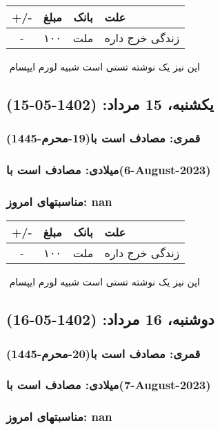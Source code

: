 \documentclass{article}
\newcommand{\rnote}[1]{\marginpar{\textcolor{color}{\StrSubstitute{\##1}{ }{\_}}}}
\newcommand{\myRow}[4]{
    #1 & #2 & #3 & #4 \\ \hline
}
\begin{document}
\begin{tabular}{ | c | c | c | p{5cm} |}
    \hline
    \myRow{ +/- }{مبلغ}{بانک}{علت}
    \myRow{-}{۱۰۰}{ملت}{زندگی خرج داره}
\end{tabular}
\newline
\newline

‌
\rnote{تست}
این نیز یک نوشته تستی است شبیه لورم ایپسام




\newpage
{}
\textcolor{color}{
\section{ یکشنبه، 15 مرداد: (1402-05-15) }
\subsubsection*{قمری: مصادف است با(19-محرم-1445)} 
\subsubsection*{میلادی: مصادف است با(6-August-2023)}
\subsubsection*{مناسبتهای امروز: nan}
}


\begin{tabular}{ | c | c | c | p{5cm} |}
    \hline
    \myRow{ +/- }{مبلغ}{بانک}{علت}
    \myRow{-}{۱۰۰}{ملت}{زندگی خرج داره}
\end{tabular}
\newline
\newline

‌
\rnote{تست}
این نیز یک نوشته تستی است شبیه لورم ایپسام




\newpage
{}
\textcolor{color}{
\section{ دوشنبه، 16 مرداد: (1402-05-16) }
\subsubsection*{قمری: مصادف است با(20-محرم-1445)} 
\subsubsection*{میلادی: مصادف است با(7-August-2023)}
\subsubsection*{مناسبتهای امروز: nan}
}
\end{document}
